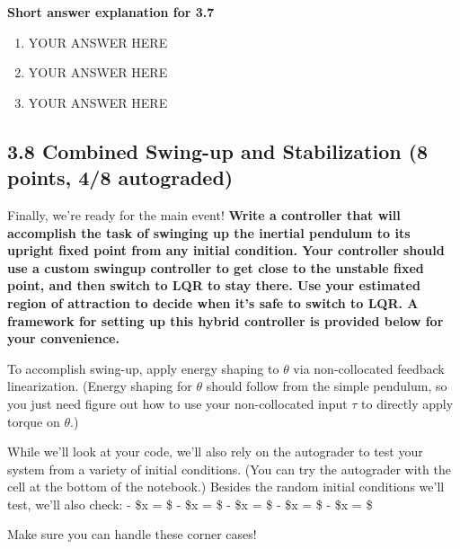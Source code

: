 \documentclass[11pt]{article}
\begin{document}
    \textbf{Short answer explanation for 3.7}

\begin{enumerate}
\def\labelenumi{\arabic{enumi})}
\item
  YOUR ANSWER HERE
\item
  YOUR ANSWER HERE
\item
  YOUR ANSWER HERE
\end{enumerate}

    \subsection{3.8 Combined Swing-up and Stabilization (8 points, 4/8
autograded)}\label{combined-swing-up-and-stabilization-8-points-48-autograded}

Finally, we're ready for the main event! \textbf{Write a controller that
will accomplish the task of swinging up the inertial pendulum to its
upright fixed point from any initial condition. Your controller should
use a custom swingup controller to get close to the unstable fixed
point, and then switch to LQR to stay there. Use your estimated region
of attraction to decide when it's safe to switch to LQR. A framework for
setting up this hybrid controller is provided below for your
convenience.}

To accomplish swing-up, apply energy shaping to \(\theta\) via
non-collocated feedback linearization. (Energy shaping for \(\theta\)
should follow from the simple pendulum, so you just need figure out how
to use your non-collocated input \(\tau\) to directly apply torque on
\(\theta\).)

While we'll look at your code, we'll also rely on the autograder to test
your system from a variety of initial conditions. (You can try the
autograder with the cell at the bottom of the notebook.) Besides the
random initial conditions we'll test, we'll also check: - \$x =
\left[ 0, 0, 0, 0 \right] \$ - \$x = \left[ \pi, 0, 0, 0 \right] \$ -
\$x = \left[ 3\pi, 0, 0, 0 \right] \$ - \$x =
\left[ 0, -100, 0, 0 \right] \$ - \$x = \left[ 0, 0, 0, 20 \right] \$

Make sure you can handle these corner cases!
\end{document}
